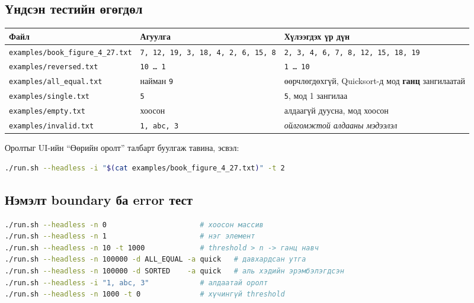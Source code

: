 \documentclass[11pt,a4paper]{article}
\begin{document}
\subsection{Үндсэн тестийн өгөгдөл}
\begin{center}
\small
\begin{tabular}{lL{5.3cm}L{4.3cm}}
\toprule
Файл & Агуулга & Хүлээгдэх үр дүн \\
\midrule
\texttt{examples/book\_figure\_4\_27.txt} & \texttt{7, 12, 19, 3, 18, 4, 2, 6, 15, 8}
& \texttt{2, 3, 4, 6, 7, 8, 12, 15, 18, 19} \\
\texttt{examples/reversed.txt} & \texttt{10 … 1} & \texttt{1 … 10} \\
\texttt{examples/all\_equal.txt} & найман \texttt{9} & өөрчлөгдөхгүй, Quicksort-д
мод \textbf{ганц} зангилаатай \\
\texttt{examples/single.txt} & \texttt{5} & \texttt{5}, мод 1 зангилаа \\
\texttt{examples/empty.txt} & хоосон & алдаагүй дуусна, мод хоосон \\
\texttt{examples/invalid.txt} & \texttt{1, abc, 3} & \emph{ойлгомжтой алдааны
мэдээлэл} \\
\bottomrule
\end{tabular}
\end{center}

Оролтыг UI-ийн ``Өөрийн оролт'' талбарт буулгаж тавина, эсвэл:
\begin{lstlisting}[language=bash]
./run.sh --headless -i "$(cat examples/book_figure_4_27.txt)" -t 2
\end{lstlisting}

\subsection{Нэмэлт boundary ба error тест}
\begin{lstlisting}[language=bash]
./run.sh --headless -n 0                      # хоосон массив
./run.sh --headless -n 1                      # нэг элемент
./run.sh --headless -n 10 -t 1000             # threshold > n -> ганц навч
./run.sh --headless -n 100000 -d ALL_EQUAL -a quick   # давхардсан утга
./run.sh --headless -n 100000 -d SORTED    -a quick   # аль хэдийн эрэмбэлэгдсэн
./run.sh --headless -i "1, abc, 3"            # алдаатай оролт
./run.sh --headless -n 1000 -t 0              # хүчингүй threshold
\end{lstlisting}
\end{document}

